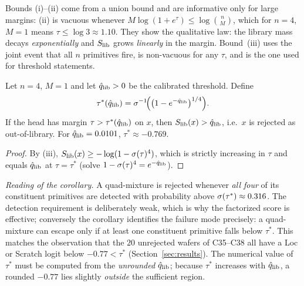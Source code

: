 \begin{remark}
Bounds (i)--(ii) come from a union bound and are informative only for large margins: (ii) is vacuous whenever $M\log(1+e^{\tau})\le\log\binom nM$, which for $n=4$, $M=1$ means $\tau\le\log3\approx1.10$. They show the
qualitative law: the library mass decays \emph{exponentially} and $S_{\mathrm{lib}}$ grows
\emph{linearly} in the margin. Bound~(iii) uses the joint event that all $n$ primitives fire,
is non-vacuous for any $\tau$, and is the one used for threshold statements.
\end{remark}

\begin{corollary}\label{cor:thr}
Let $n=4$, $M=1$ and let $\hat q_{\mathrm{lib}}>0$ be the calibrated threshold. Define
\[
\tau^\ast(\hat q_{\mathrm{lib}})=\sigma^{-1}\!\Bigl(\bigl(1-e^{-\hat q_{\mathrm{lib}}}\bigr)^{1/4}\Bigr).
\]
If the head has margin $\tau>\tau^\ast(\hat q_{\mathrm{lib}})$ on $x$, then $S_{\mathrm{lib}}(x)>\hat q_{\mathrm{lib}}$, i.e.\ $x$ is
rejected as out-of-library. For $\hat q_{\mathrm{lib}}=0.0101$, $\tau^\ast\approx-0.769$.
\end{corollary}
\begin{proof}
By (iii), $S_{\mathrm{lib}}(x)\ge-\log(1-\sigma(\tau)^4)$, which is strictly increasing in $\tau$ and
equals $\hat q_{\mathrm{lib}}$ at $\tau=\tau^\ast$ (solve $1-\sigma(\tau)^4=e^{-\hat q_{\mathrm{lib}}}$).
\end{proof}
\noindent\emph{Reading of the corollary.} A quad-mixture is rejected whenever \emph{all four} of
its constituent primitives are detected with probability above $\sigma(\tau^\ast)\approx0.316$.
The detection requirement is deliberately weak, which is why the factorized score is
effective; conversely the corollary identifies the failure mode precisely: a quad-mixture can
escape only if at least one constituent primitive falls below $\tau^\ast$. This matches the
observation that the $20$ unrejected wafers of C35--C38 all have a Loc or Scratch logit below
$-0.77<\tau^\ast$ (Section~\ref{sec:results}). The numerical value of $\tau^\ast$ must be computed from the
\emph{unrounded} $\hat q_{\mathrm{lib}}$; because $\tau^\ast$ increases with $\hat q_{\mathrm{lib}}$, a rounded
$-0.77$ lies slightly \emph{outside} the sufficient region.

